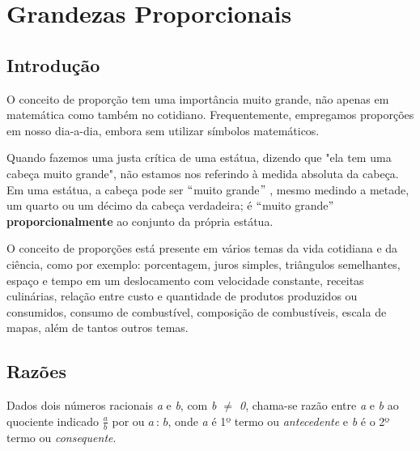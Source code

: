 \chapter{Grandezas Proporcionais}

\section{Introdução}

\quad O conceito de proporção tem uma importância muito grande, não apenas em matemática como também no cotidiano. Frequentemente, empregamos proporções em nosso dia-a-dia, embora sem utilizar símbolos matemáticos. 

\quad Quando fazemos uma justa crítica de uma estátua, dizendo que "ela tem uma cabeça muito grande", não estamos nos referindo à medida absoluta da cabeça. Em uma estátua, a cabeça pode ser $``$muito grande$"$ , mesmo medindo a metade, um quarto ou um décimo da cabeça verdadeira; é $``$muito grande$"$  \textbf{proporcionalmente }ao conjunto da própria estátua.

O conceito de proporções está presente em vários temas da vida cotidiana e da ciência, como por exemplo: porcentagem, juros simples, triângulos semelhantes, espaço e tempo em um deslocamento com velocidade constante, receitas culinárias, relação entre custo e quantidade de produtos produzidos ou consumidos, consumo de combustível, composição de combustíveis, escala de mapas, além de tantos outros temas.

\section{Razões}
 
\begin{caixa}
\begin{tdefinicao}
	Dados dois números racionais \textit{a} e \textit{b}, com \textit{b $\neq$ 0}, chama-se razão entre \textit{a} e \textit{b} ao quociente indicado $\frac{a}{b}$ por ou $a \, : \, b$,
	onde \textit{a} é 1º termo ou \textit{antecedente} e \textit{b }é o 2º termo ou \textit{consequente}.
\end{tdefinicao}
\end{caixa}

